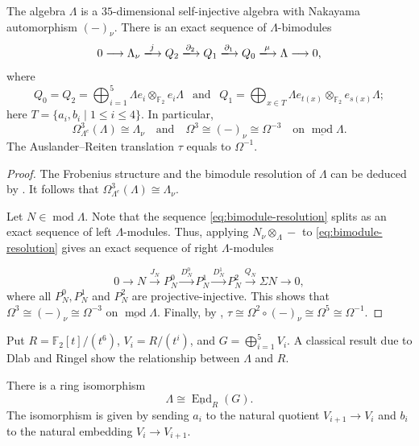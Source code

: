 \documentclass[a4paper,reqno,10pt]{amsart}
\numberwithin{equation}{section}
\DeclareMathOperator{\modu}{mod}
\DeclareMathOperator{\End}{End}
\newcommand{\kk}{\mathbb F_2}
\newcommand{\Lam}{\Lambda}
\newcommand{\ol}[1]{\underline{#1}}
\begin{document}
\begin{proposition}\label{prop:periodicity}
The algebra $\Lam$ is a $35$-dimensional self-injective algebra with Nakayama
automorphism $(-)_\nu$. There is an exact sequence of $\Lam$-bimodules
\begin{equation}\label{eq:bimodule-resolution}
0\longrightarrow\Lam_\nu\xlongrightarrow{j}Q_2
\xlongrightarrow{\partial_2}Q_1\xlongrightarrow{\partial_1}Q_0
\xlongrightarrow{\mu}\Lam\longrightarrow0,
\end{equation}
where 
\[
 Q_0=Q_2=\bigoplus_{i=1}^5\Lam e_i\otimes_{\kk} e_i\Lam
~~\text{ and }~~
 Q_1=\bigoplus_{x\in T}\Lam e_{t(x)}
 \otimes_{\kk} e_{s(x)}\Lam;
\]
here $T=\{a_i,b_i\mid 1\leq i\leq 4\}$. 
In particular,
\[
 \Omega^3_{\Lam^e}(\Lam)\cong\Lam_\nu
 \quad\text{and}\quad
 \Omega^3\cong(-)_\nu\cong\Omega^{-3}
 \quad\text{on }\ol{\modu}\Lam.
\]
The Auslander--Reiten translation $\tau$ equals to $\Omega^{-1}$. 
\end{proposition}

\begin{proof}
The Frobenius structure and the bimodule resolution of $\Lambda$ can be deduced by 
\cite[Theorems~4.8 and 4.9]{BrennerButlerKing2002}. It follows that $\Omega^3_{\Lam^e}(\Lam)\cong\Lam_\nu$. 

\vskip5pt

Let $N\in \modu \Lambda$. Note that the sequence \eqref{eq:bimodule-resolution} splits as an exact sequence of left $\Lambda$-modules. Thus, applying $N_\nu\otimes_\Lam-$ to \eqref{eq:bimodule-resolution} gives an exact sequence of right $\Lambda$-modules

\begin{equation}\label{eq:tensor-sequence}
0\to N\xrightarrow{J_N}P_N^0\xrightarrow{D_N^0}P_N^1
\xrightarrow{D_N^1}P_N^2\xrightarrow{Q_N}\Sigma N\to0, 
\end{equation}
where all $P_N^0, P_N^1$ and $P_N^2$ are projective-injective. This shows that $\Omega^3\cong(-)_\nu\cong\Omega^{-3}$ on $\ol{\modu}\Lam$. Finally, by \cite[Chapter~IV, Proposition~3.7] {AuslanderReitenSmalo1995}, $\tau\cong\Omega^2\circ(-)_\nu\cong\Omega^5\cong\Omega^{-1}$.
\end{proof}

Put $R=\kk[t]/(t^6)$, $V_i=R/(t^i)$, and $G=\bigoplus_{i=1}^5V_i$. A classical result due to Dlab and Ringel show the relationship between $\Lambda$ and $R$. 

\begin{proposition}\label{LambdaR}\cite[\S7, pp.~220--221]{DlabRingel1992}
There is a ring isomorphism
\[
 \Lam\cong\ol{\End}_R(G).
\]
The isomorphism is given by sending $a_i$ to the natural quotient $V_{i+1}\longrightarrow V_i$ and $b_i$ to the natural embedding $V_i\longrightarrow V_{i+1}$. 
\end{proposition}
\end{document}
